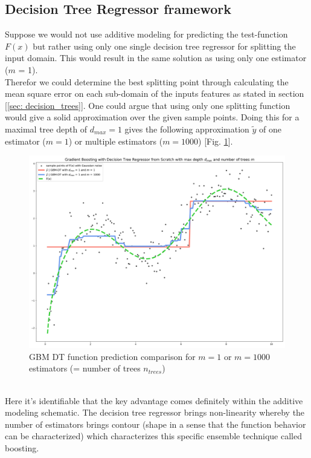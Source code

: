 \documentclass[12pt, a4paper]{article}
\begin{document}
\subsection{Decision Tree Regressor framework}
Suppose we would not use additive modeling for predicting the test-function $F(x)$ but rather using only one single decision tree regressor for splitting the input domain. This would result in the same solution as using only one estimator ($m$ = 1). \\
Therefor we could determine the best splitting point through calculating the mean square error on each sub-domain of the inputs features as stated in section [\ref{sec: decision_trees}]. One could argue that using only one splitting function would give a solid approximation over the given sample points. Doing this for a maximal tree depth of $d_{max} = 1$ gives the following approximation $\tilde{y}$ of one estimator ($m = 1$) or multiple estimators ($m = 1000$) [Fig. \ref{fig: gbm_dt_comparison}].
\begin{figure}[!htpb]
    \centering
    \includegraphics[width=1\textwidth,trim={0 0 0 0},clip]{figures/gbm_decision_tree_comparison.png}
    \caption[GBM-DT function prediction comparison over estimators]{GBM DT function prediction comparison for $m = 1$ or $m = 1000$ estimators (= number of trees $n_{trees}$)}
    \label{fig: gbm_dt_comparison}
\end{figure}
\\
Here it's identifiable that the key advantage comes definitely within the additive modeling schematic. The decision tree regressor brings non-linearity whereby the number of estimators brings contour (shape in a sense that the function behavior can be characterized) which characterizes this specific ensemble technique called boosting. \\
\end{document}
